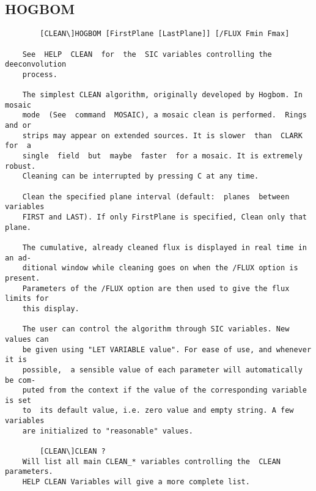 \subsection{HOGBOM}
\begin{verbatim}
        [CLEAN\]HOGBOM [FirstPlane [LastPlane]] [/FLUX Fmin Fmax]

    See  HELP  CLEAN  for  the  SIC variables controlling the deeconvolution
    process.

    The simplest CLEAN algorithm, originally developed by Hogbom. In  mosaic
    mode  (See  command  MOSAIC), a mosaic clean is performed.  Rings and or
    strips may appear on extended sources. It is slower  than  CLARK  for  a
    single  field  but  maybe  faster  for a mosaic. It is extremely robust.
    Cleaning can be interrupted by pressing C at any time.

    Clean the specified plane interval (default:  planes  between  variables
    FIRST and LAST). If only FirstPlane is specified, Clean only that plane.

    The cumulative, already cleaned flux is displayed in real time in an ad-
    ditional window while cleaning goes on when the /FLUX option is present.
    Parameters of the /FLUX option are then used to give the flux limits for
    this display.

    The user can control the algorithm through SIC variables. New values can
    be given using "LET VARIABLE value". For ease of use, and whenever it is
    possible,  a sensible value of each parameter will automatically be com-
    puted from the context if the value of the corresponding variable is set
    to  its default value, i.e. zero value and empty string. A few variables
    are initialized to "reasonable" values.

        [CLEAN\]CLEAN ?
    Will list all main CLEAN_* variables controlling the  CLEAN  parameters.
    HELP CLEAN Variables will give a more complete list.

\end{verbatim}
